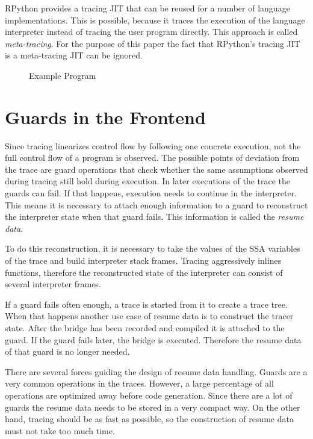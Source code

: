 \documentclass[10pt,preprint]{sigplanconf}
\begin{document}
RPython provides a tracing JIT that can be reused for a number of language
implementations. This is possible, because it traces the execution of the
language interpreter instead of tracing the user program directly. This
approach is called \emph{meta-tracing}. For the purpose of this paper the fact
that RPython's tracing JIT is a meta-tracing JIT can be ignored.


\begin{figure}
    
    \caption{Example Program}
    \label{fig:trace-log}
\end{figure}

\section{Guards in the Frontend} %
\label{sec:Resume Data}

Since tracing linearizes control flow by following one concrete execution,
not the full control flow of a program is observed.
The possible points of deviation from the trace are guard operations
that check whether the same assumptions observed during tracing still hold during execution.
In later executions of the trace the guards can fail.
If that happens, execution needs to continue in the interpreter.
This means it is necessary to attach enough information to a guard
to reconstruct the interpreter state when that guard fails.
This information is called the \emph{resume data}.

To do this reconstruction, it is necessary to take the values of the SSA
variables of the trace and build interpreter stack frames.  Tracing
aggressively inlines functions, therefore the reconstructed state of the
interpreter can consist of several interpreter frames.

If a guard fails often enough, a trace is started from it
to create a trace tree.
When that happens another use case of resume data
is to construct the tracer state.
After the bridge has been recorded and compiled it is attached to the guard.
If the guard fails later, the bridge is executed. Therefore the resume data of
that guard is no longer needed.

There are several forces guiding the design of resume data handling.
Guards are a very common operations in the traces.
However, a large percentage of all operations
are optimized away before code generation.
Since there are a lot of guards
the resume data needs to be stored in a very compact way.
On the other hand, tracing should be as fast as possible,
so the construction of resume data must not take too much time.
\end{document}

